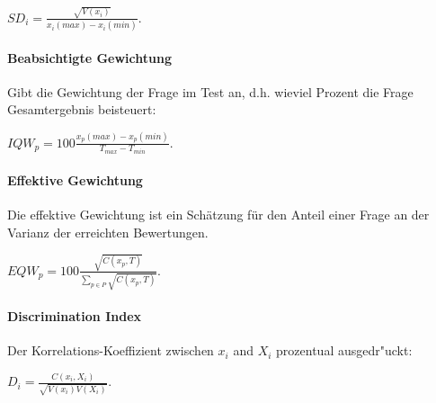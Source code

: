 \documentclass[12pt]{report}
\begin{document}
$SD_i = \frac{\sqrt{V(x_i)}}{x_i(max) - x_i(min)}$.

\paragraph{Beabsichtigte Gewichtung}
Gibt die Gewichtung der Frage im Test an, d.h. wieviel Prozent die Frage Gesamtergebnis beisteuert:

$IQW_p = 100\frac{x_p(max) - x_p(min)}{T_{max} - T_{min}}$.\\

\paragraph{Effektive Gewichtung}

Die effektive Gewichtung ist ein Schätzung für den Anteil einer Frage an der Varianz der erreichten Bewertungen.

$EQW_p = 100\frac{\sqrt{C(x_p, T)}}{\sum_{p \in P}\sqrt{C(x_p, T)}}.$\\

\paragraph{Discrimination Index}
Der Korrelations-Koeffizient zwischen $x_i$ and $X_i$ prozentual ausgedr"uckt:

$D_i= \frac{C(x_i, X_i)}{\sqrt{V(x_i)V(X_i)}}$.


\ \\

\end{document}
